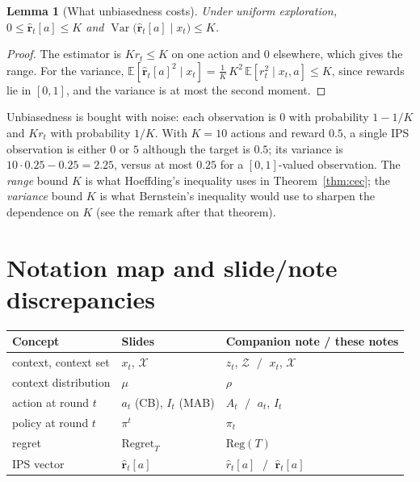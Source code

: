 \documentclass[11pt,a4paper]{article}
\newcommand{\E}{\mathbb{E}}
\newcommand{\rh}{\hat{\mathbf{r}}}
\newcommand{\calX}{\mathcal{X}}
\DeclareMathOperator{\Var}{Var}
\theoremstyle{plain}
\newtheorem{lemma}[theorem]{Lemma}
\theoremstyle{definition}
\theoremstyle{remark}
\begin{document}
\begin{lemma}[What unbiasedness costs]\label{lem:range}
Under uniform exploration, $0\le\rh_t[a]\le K$ and $\Var\bigl(\rh_t[a]\mid x_t\bigr)\le K$.
\end{lemma}
\begin{proof}
The estimator is $Kr_t\le K$ on one action and $0$ elsewhere, which gives the range. For the variance,
$\E[\rh_t[a]^2\mid x_t]=\frac1K\,K^2\,\E[r_t^2\mid x_t,a]\le K$, since rewards lie in $[0,1]$, and the variance is at most the second moment.
\end{proof}

\begin{intuition}
Unbiasedness is bought with noise: each observation is $0$ with probability $1-1/K$ and $Kr_t$ with probability $1/K$. With $K=10$ actions and reward $0.5$, a single IPS observation is either $0$ or $5$ although the target is $0.5$; its variance is $10\cdot0.25-0.25=2.25$, versus at most $0.25$ for a $[0,1]$-valued observation.
The \emph{range} bound $K$ is what Hoeffding's inequality uses in Theorem~\ref{thm:cec}; the \emph{variance} bound $K$ is what Bernstein's inequality would use to sharpen the dependence on $K$ (see the remark after that theorem).
\end{intuition}

\section{Notation map and slide/note discrepancies}\label{app:notes}

\begin{table}[ht]
\centering\small
\renewcommand{\arraystretch}{1.2}
\begin{tabular}{lll}\toprule
\textbf{Concept} & \textbf{Slides} & \textbf{Companion note / these notes}\\\midrule
context, context set & $x_t$, $\mathcal X$ & $z_t$, $\mathcal Z$ $\;/\;$ $x_t$, $\calX$\\
context distribution & $\mu$ & $\rho$\\
action at round $t$ & $a_t$ (CB), $I_t$ (MAB) & $A_t$ $\;/\;$ $a_t$, $I_t$\\
policy at round $t$ & $\pi^t$ & $\pi_t$\\
regret & $\mathrm{Regret}_T$ & $\mathrm{Reg}(T)$\\
IPS vector & $\hat{\mathbf r}_t[a]$ & $\hat r_t[a]$ $\;/\;$ $\rh_t[a]$\\\bottomrule
\end{tabular}
\end{table}
\end{document}
